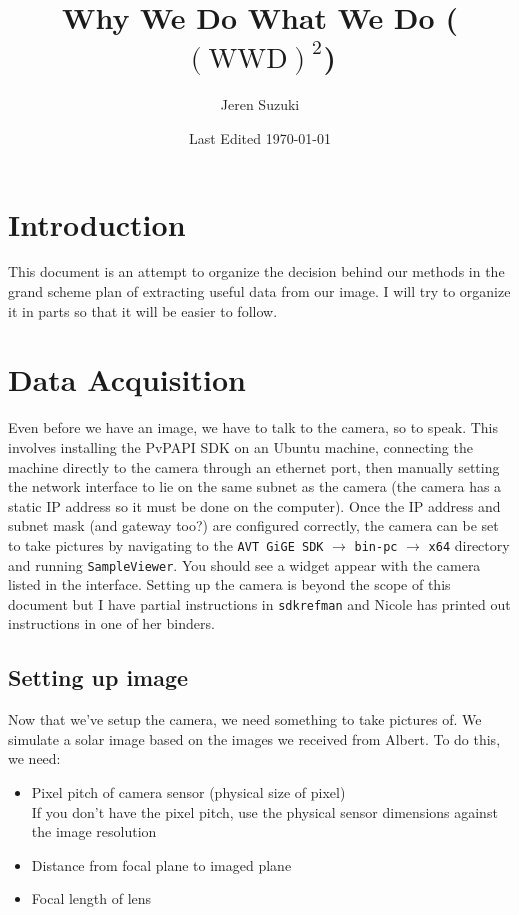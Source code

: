 \documentclass[10pt]{scrartcl}
\title{Why We Do What We Do ($(\textrm{WWD})^2$)}
\author{Jeren Suzuki}
\date{Last Edited \today}
\begin{document}
\maketitle
\tableofcontents
{}
\clearpage
{}

\section*{Introduction} %
\label{sec:introduction}
\indent This document is an attempt to organize the decision behind our methods in the grand scheme plan of extracting useful data from our image. I will try to organize it in parts so that it will be easier to follow.

\section{Data Acquisition} %
\label{sec:data_acquisition}
Even before we have an image, we have to talk to the camera, so to speak. This involves installing the PvPAPI SDK on an Ubuntu machine, connecting the machine directly to the camera through an ethernet port, then manually setting the network interface to lie on the same subnet as the camera (the camera has a static IP address so it must be done on the computer). Once the IP address and subnet mask (and gateway too?) are configured correctly, the camera can be set to take pictures by navigating to the \texttt{AVT GiGE SDK} $\rightarrow$ \texttt{bin-pc} $\rightarrow$ \texttt{x64} directory and running \texttt{SampleViewer}. You should see a widget appear with the camera listed in the interface. Setting up the camera is beyond the scope of this document but I have partial instructions in \texttt{sdkrefman} and Nicole has printed out instructions in one of her binders. 

\subsection{Setting up image} %
\label{sub:setting_up_image}

Now that we've setup the camera, we need something to take pictures of. We simulate a solar image based on the images we received from Albert. To do this, we need:

\begin{itemize}
    \item Pixel pitch of camera sensor (physical size of pixel)\\   
        If you don't have the pixel pitch, use the physical sensor dimensions against the image resolution
    \item Distance from focal plane to imaged plane
    \item Focal length of lens
\end{itemize}
\end{document}
